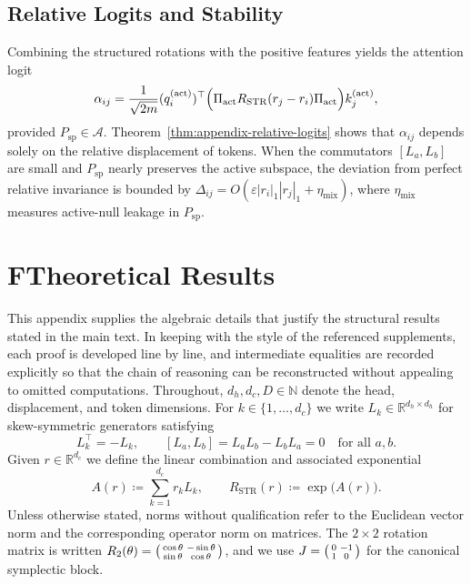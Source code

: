 \documentclass[11pt]{article}
\newcommand{\Real}{\mathbb{R}}
\begin{document}
\subsection{Relative Logits and Stability}

Combining the structured rotations with the positive features yields the attention logit
\[
\alpha_{ij}
= \frac{1}{\sqrt{2m}} (q_i^{(\mathrm{act})})^\top
  \Bigl(\Pi_{\mathrm{act}} R_{\mathrm{STR}}(r_j - r_i) \Pi_{\mathrm{act}}\Bigr)
  k_j^{(\mathrm{act})},
\]
provided $P_{\mathrm{sp}}\in\mathcal{A}$. Theorem~\ref{thm:appendix-relative-logits} shows that $\alpha_{ij}$ depends solely on the
relative displacement of tokens. When the commutators $[L_a,L_b]$ are small and
$P_{\mathrm{sp}}$ nearly preserves the active subspace, the deviation from perfect relative invariance is
bounded by $\Delta_{ij} = O(\varepsilon |r_i|_1 |r_j|_1 + \eta_{\mathrm{mix}})$, where $\eta_{\mathrm{mix}}$ measures
active-null leakage in $P_{\mathrm{sp}}$.



\clearpage
\appendix
\section*{F\quad Theoretical Results}
\label{sec:appendix-theory}

This appendix supplies the algebraic details that justify the structural results stated in the main text.
In keeping with the style of the referenced supplements, each proof is developed line by line, and
intermediate equalities are recorded explicitly so that the chain of reasoning can be reconstructed
without appealing to omitted computations.  Throughout, $d_h,d_c,D\in\mathbb{N}$ denote the head,
displacement, and token dimensions.  For $k\in\{1,\dots,d_c\}$ we write $L_k\in\Real^{d_h\times d_h}$
for skew-symmetric generators satisfying
\begin{equation}
  L_k^\top = -L_k,
  \qquad
  [L_a,L_b] = L_aL_b - L_bL_a = 0
  \quad\text{for all } a,b.
  \label{eq:appendix-commuting-generators}
\end{equation}
Given $r\in\Real^{d_c}$ we define the linear combination and associated exponential
\begin{equation}
  A(r) \coloneqq \sum_{k=1}^{d_c} r_k L_k,
  \qquad
  R_{\mathrm{STR}}(r) \coloneqq \exp\!\big(A(r)\big).
  \label{eq:appendix-def-A-R}
\end{equation}
Unless otherwise stated, norms without qualification refer to the Euclidean vector norm and the
corresponding operator norm on matrices.  The $2\times 2$ rotation matrix is written
$R_2(\theta) = \begin{psmallmatrix}\cos\theta & -\sin\theta\\ \sin\theta & \cos\theta\end{psmallmatrix}$,
and we use $J = \begin{psmallmatrix}0 & -1\\ 1 & 0\end{psmallmatrix}$ for the canonical symplectic block.
\end{document}

